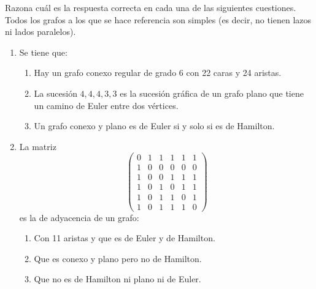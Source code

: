 \begin{ejercicio}\label{ej:1.40}
    Razona cuál es la respuesta correcta en cada una de las siguientes cuestiones. Todos los grafos a los que se hace referencia son simples (es decir, no tienen lazos ni lados paralelos).
    \begin{enumerate}
        \item Se tiene que:
        \begin{enumerate}
            \item Hay un grafo conexo regular de grado 6 con 22 caras y 24 aristas.
            \item La sucesión $4, 4, 4, 3, 3$ es la sucesión gráfica de un grafo plano que tiene un camino de Euler entre dos vértices.
            \item Un grafo conexo y plano es de Euler si y solo si es de Hamilton.
        \end{enumerate}
        \item La matriz
        \[
            \begin{pmatrix}
                0 & 1 & 1 & 1 & 1 & 1 \\
                1 & 0 & 0 & 0 & 0 & 0 \\
                1 & 0 & 0 & 1 & 1 & 1 \\
                1 & 0 & 1 & 0 & 1 & 1 \\
                1 & 0 & 1 & 1 & 0 & 1 \\
                1 & 0 & 1 & 1 & 1 & 0
            \end{pmatrix}
        \]
        es la de adyacencia de un grafo:
        \begin{enumerate}
            \item Con 11 aristas y que es de Euler y de Hamilton.
            \item Que es conexo y plano pero no de Hamilton.
            \item Que no es de Hamilton ni plano ni de Euler.
        \end{enumerate}
    \end{enumerate}
\end{ejercicio}


